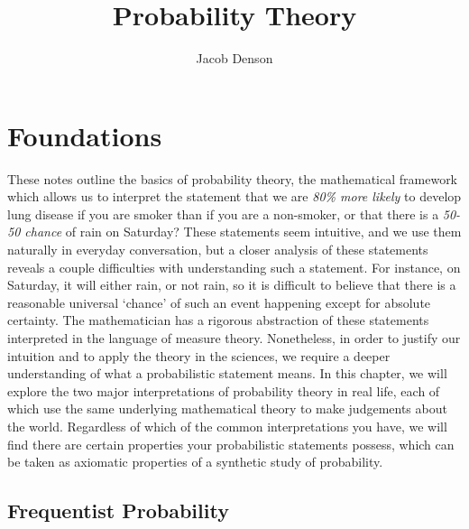 

\title{Probability Theory}
\author{Jacob Denson}



\maketitle
\tableofcontents
{}

\chapter{Foundations}

These notes outline the basics of probability theory, the mathematical framework which allows us to interpret the statement that we are {\it 80\% more likely} to develop lung disease if you are smoker than if you are a non-smoker, or that there is a {\it 50-50 chance} of rain on Saturday? These statements seem intuitive, and we use them naturally in everyday conversation, but a closer analysis of these statements reveals a couple difficulties with understanding such a statement. For instance, on Saturday, it will either rain, or not rain, so it is difficult to believe that there is a reasonable universal `chance' of such an event happening except for absolute certainty. The mathematician has a rigorous abstraction of these statements interpreted in the language of measure theory. Nonetheless, in order to justify our intuition and to apply the theory in the sciences, we require a deeper understanding of what a probabilistic statement means. In this chapter, we will explore the two major interpretations of probability theory in real life, each of which use the same underlying mathematical theory to make judgements about the world. Regardless of which of the common interpretations you have, we will find there are certain properties your probabilistic statements possess, which can be taken as axiomatic properties of a synthetic study of probability.

\section{Frequentist Probability}

